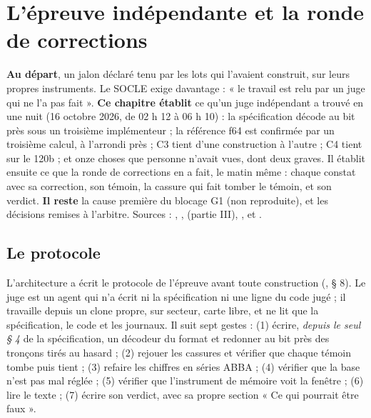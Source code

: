 \ifdefined\GrapheResVitesse\else\fi

\chapter{L'épreuve indépendante et la ronde de corrections}\label{ch:t2-epreuve}

\begin{origine}
\textbf{Au départ}, un jalon déclaré tenu par les lots qui l'avaient construit, sur leurs propres instruments. Le SOCLE exige davantage : « le travail est relu par un juge qui ne l'a pas fait ».
\textbf{Ce chapitre établit} ce qu'un juge indépendant a trouvé en une nuit (16 octobre 2026, de 02 h 12 à 06 h 10) : la spécification décode au bit près sous un troisième implémenteur ; la référence f64 est confirmée par un troisième calcul, à l'arrondi près ; C3 tient d'une construction à l'autre ; C4 tient sur le 120b ; et onze choses que personne n'avait vues, dont deux graves. Il établit ensuite ce que la ronde de corrections en a fait, le matin même : chaque constat avec sa correction, son témoin, la cassure qui fait tomber le témoin, et son verdict.
\textbf{Il reste} la cause première du blocage G1 (non reproduite), et les décisions remises à l'arbitre.
Sources : , ,  (partie III), ,  et .
\end{origine}

\section{Le protocole}\label{t2e-sec:protocole}

L'architecture a écrit le protocole de l'épreuve avant toute construction (, § 8). Le juge est un agent qui n'a écrit ni la spécification ni une ligne du code jugé ; il travaille depuis un clone propre, sur secteur, carte libre, et ne lit que la spécification, le code et les journaux. Il suit sept gestes : (1) écrire, \emph{depuis le seul § 4} de la spécification, un décodeur du format et redonner au bit près des tronçons tirés au hasard ; (2) rejouer les cassures et vérifier que chaque témoin tombe puis tient ; (3) refaire les chiffres en séries ABBA ; (4) vérifier que la base n'est pas mal réglée ; (5) vérifier que l'instrument de mémoire voit la fenêtre ; (6) lire le texte ; (7) écrire son verdict, avec sa propre section « Ce qui pourrait être faux ».

